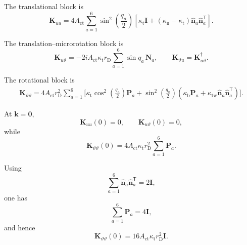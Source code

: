 The translational block is
\begin{equation}
    \mathbf{K}_{uu}
    =
    4A_{\mathrm{ct}}
    \sum_{a=1}^{6}
    \sin^2\!\left(\frac{q_a}{2}\right)
    \left[
        \kappa_{\mathrm{t}}\mathbf{I}
        +
        \left(
            \kappa_{\mathrm{n}}-\kappa_{\mathrm{t}}
        \right)
        \hat{\mathbf{n}}_a\hat{\mathbf{n}}_a^{\mathsf{T}}
    \right].
\end{equation}

The translation--microrotation block is
\begin{equation}
    \mathbf{K}_{u\vartheta}
    =
    -2iA_{\mathrm{ct}}\kappa_{\mathrm{t}}r_{\mathrm{D}}
    \sum_{a=1}^{6}
    \sin q_a\,\mathbf{N}_a,
    \qquad
    \mathbf{K}_{\vartheta u}
    =
    \mathbf{K}_{u\vartheta}^{\dagger}.
\end{equation}

The rotational block is
\begin{equation}
\begin{aligned}
    \mathbf{K}_{\vartheta\vartheta}
    =
    4A_{\mathrm{ct}}r_{\mathrm{D}}^2
    \sum_{a=1}^{6}
    \Bigg[
        \kappa_{\mathrm{t}}
        \cos^2\!\left(\frac{q_a}{2}\right)\mathbf{P}_a
        +
        \sin^2\!\left(\frac{q_a}{2}\right)
        \left(
            \kappa_{\mathrm{b}}\mathbf{P}_a
            +
            \kappa_{\mathrm{tw}}
            \hat{\mathbf{n}}_a\hat{\mathbf{n}}_a^{\mathsf{T}}
        \right)
    \Bigg].
\end{aligned}
\end{equation}

At $\mathbf{k}=\mathbf{0}$,
\begin{equation}
    \mathbf{K}_{uu}(0)=0,
    \qquad
    \mathbf{K}_{u\vartheta}(0)=0,
\end{equation}
while
\begin{equation}
    \mathbf{K}_{\vartheta\vartheta}(0)
    =
    4A_{\mathrm{ct}}\kappa_{\mathrm{t}}r_{\mathrm{D}}^2
    \sum_{a=1}^{6}\mathbf{P}_a.
\end{equation}

Using
\begin{equation}
    \sum_{a=1}^{6}
    \hat{\mathbf{n}}_a\hat{\mathbf{n}}_a^{\mathsf{T}}
    =
    2\mathbf{I},
\end{equation}
one has
\begin{equation}
    \sum_{a=1}^{6}\mathbf{P}_a
    =
    4\mathbf{I},
\end{equation}
and hence
\begin{equation}
    \boxed{
    \mathbf{K}_{\vartheta\vartheta}(0)
    =
    16A_{\mathrm{ct}}\kappa_{\mathrm{t}}r_{\mathrm{D}}^2\mathbf{I}.
    }
\end{equation}

